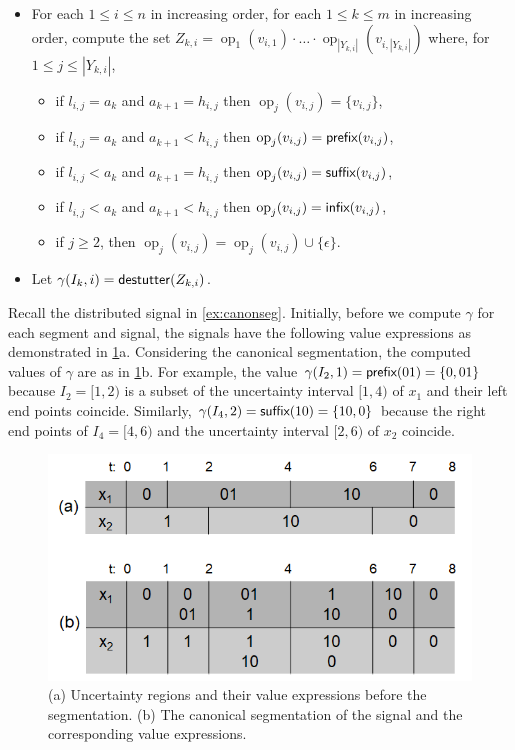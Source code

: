 \begin{itemize}
	\item For each $1 \leq i \leq n$ in increasing order, for each $1 \leq k \leq m$ in increasing order, compute the set $Z_{k,i} = \operatorname{op}_1(v_{i,1}) \cdot \ldots \cdot \operatorname{op}_{|Y_{k,i}|}(v_{i,|Y_{k,i}|})$ where, for $1 \leq j \leq |Y_{k,i}|$,
	\begin{itemize}
		\item if $l_{i,j} = a_k$ and $a_{k+1} = h_{i,j}$ then $\operatorname{op}_j(v_{i,j}) = \{v_{i,j}\}$,
		\item if $l_{i,j} = a_k$ and $a_{k+1} < h_{i,j}$ then $\operatorname{op}_j(v_{i,j}) = \textsf{prefix}(v_{i,j})$,
		\item if $l_{i,j} < a_k$ and $a_{k+1} = h_{i,j}$ then $\operatorname{op}_j(v_{i,j}) = \textsf{suffix}(v_{i,j})$,
		\item if $l_{i,j} < a_k$ and $a_{k+1} < h_{i,j}$ then $\operatorname{op}_j(v_{i,j}) = \textsf{infix}(v_{i,j})$,
		\item if $j \geq 2$, then $\operatorname{op}_j(v_{i,j}) = \operatorname{op}_j(v_{i,j}) \cup \{\epsilon\}$.
	\end{itemize}
	\item Let $\gamma(I_k, i) = \mathsf{destutter}(Z_{k,i})$.
\end{itemize}

\begin{example}
	Recall the distributed signal in \cref{ex:canonseg}.
	Initially, before we compute $\gamma$ for each segment and signal, the signals have the following value expressions as demonstrated in \cref{fig:canonseg}a.
	Considering the canonical segmentation, the computed values of $\gamma$ are as in \cref{fig:canonseg}b.
	For example, the value $\gamma(I_2,1) = \textsf{prefix}(01) = \{0, 01\}$ because $I_2 = [1,2)$ is a subset of the uncertainty interval $[1,4)$ of $x_1$ and their left end points coincide.
	Similarly, $\gamma(I_4,2) = \textsf{suffix}(10) = \{ 10, 0\}$ because the right end points of $I_4 = [4,6)$ and the uncertainty interval $[2,6)$ of $x_2$ coincide.
\end{example}

\begin{figure} 
	\centering
	\includegraphics[scale=0.4]{canonseg.png}
	\caption{(a) Uncertainty regions and their value expressions before the segmentation. (b) The canonical segmentation of the signal and the corresponding value expressions.\label{fig:canonseg}}
\end{figure}

